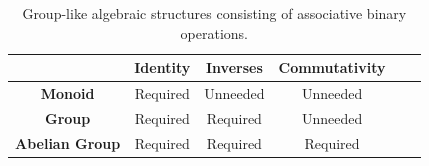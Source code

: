 \documentclass[10pt, titlepage]{amsart}
\theoremstyle{definition}
\begin{document}
	\begin{table}[]
		\centering
		\caption{Group-like algebraic structures consisting of associative binary operations.}
		\label{table:group-like_algebraic_structures}
		\begin{tabular}{@{}cccccc@{}}
			\toprule
			& \textbf{Identity}                & \textbf{Inverses}                & \textbf{Commutativity}           \\ \midrule
			\textbf{Monoid}       & \cellcolor[HTML]{9AFF99}Required & \cellcolor[HTML]{FFCCC9}Unneeded & \cellcolor[HTML]{FFCCC9}Unneeded \\
			\textbf{Group}        & \cellcolor[HTML]{9AFF99}Required & \cellcolor[HTML]{9AFF99}Required & \cellcolor[HTML]{FFCCC9}Unneeded \\
			\textbf{Abelian Group} & \cellcolor[HTML]{9AFF99}Required & \cellcolor[HTML]{9AFF99}Required & \cellcolor[HTML]{9AFF99}Required \\ \bottomrule
		\end{tabular}
	\end{table}
	
\end{document}
